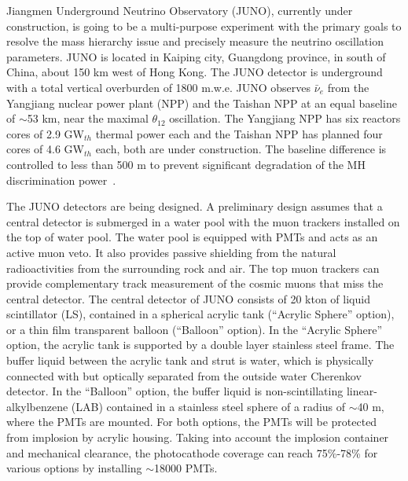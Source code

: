 Jiangmen Underground Neutrino Observatory (JUNO), currently under construction, is going to be a multi-purpose experiment with the primary goals to resolve the mass hierarchy issue and precisely measure the neutrino oscillation parameters.
JUNO is located in Kaiping city, Guangdong province, in south of China, about 150 km west of Hong Kong. The JUNO detector is underground with a total vertical overburden of 1800 m.w.e. JUNO observes $\bar\nu_e$ from the Yangjiang nuclear power plant (NPP) and the Taishan NPP at an equal baseline of $\sim$53 km, near the maximal $\theta_{12}$ oscillation. The Yangjiang NPP has six reactors cores of 2.9 GW$_{th}$ thermal power each and the Taishan NPP has planned four cores of 4.6 GW$_{th}$ each, both are under construction. The baseline difference is controlled to less than 500 m to prevent significant degradation of the MH discrimination power~\cite{Li-PRD13}.

The JUNO detectors are being designed. A preliminary design assumes that a central detector is submerged in a water pool with the muon trackers installed on the top of water pool. The water pool is equipped with PMTs and acts as an active muon veto. It also provides passive shielding from the natural radioactivities from the surrounding rock and air. The top muon trackers can provide complementary track measurement of the cosmic muons that miss the central detector. The central detector of JUNO consists of 20 kton of liquid scintillator (LS), contained in a spherical acrylic tank (``Acrylic Sphere'' option), or a thin film transparent balloon (``Balloon'' option). In the ``Acrylic Sphere'' option, the acrylic tank is supported by a double layer stainless steel frame. The buffer liquid between the acrylic tank and strut is water, which is physically connected with but optically separated from the outside water Cherenkov detector. In the ``Balloon'' option, the buffer liquid is non-scintillating linear-alkylbenzene (LAB) contained in a stainless steel sphere of a radius of $\sim $40 m, where the PMTs are mounted. For both options, the PMTs will be protected from implosion by acrylic housing. Taking into account the implosion container and mechanical clearance, the photocathode coverage can reach 75\%-78\% for various options by installing $\sim$18000 PMTs.

